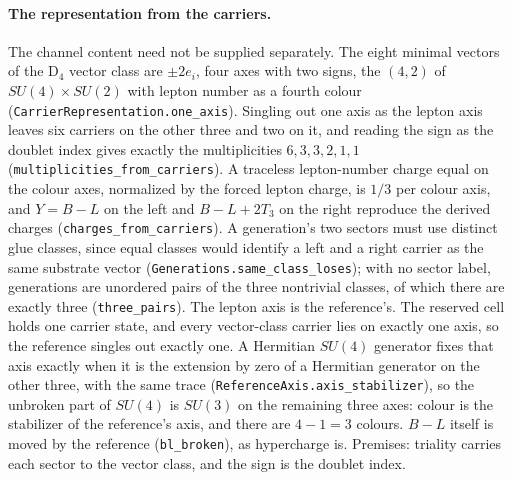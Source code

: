 \paragraph{The representation from the carriers.} The channel content need not be supplied separately. The eight minimal vectors of the D$_4$ vector class are $\pm2e_i$, four axes with two signs, the $(4,2)$ of $SU(4)\times SU(2)$ with lepton number as a fourth colour (\texttt{CarrierRepresentation.one\_axis}). Singling out one axis as the lepton axis leaves six carriers on the other three and two on it, and reading the sign as the doublet index gives exactly the multiplicities $6,3,3,2,1,1$ (\texttt{multiplicities\_from\_carriers}). A traceless lepton-number charge equal on the colour axes, normalized by the forced lepton charge, is $1/3$ per colour axis, and $Y=B-L$ on the left and $B-L+2T_3$ on the right reproduce the derived charges (\texttt{charges\_from\_carriers}). A generation's two sectors must use distinct glue classes, since equal classes would identify a left and a right carrier as the same substrate vector (\texttt{Generations.same\_class\_loses}); with no sector label, generations are unordered pairs of the three nontrivial classes, of which there are exactly three (\texttt{three\_pairs}). The lepton axis is the reference's. The reserved cell holds one carrier state, and every vector-class carrier lies on exactly one axis, so the reference singles out exactly one. A Hermitian $SU(4)$ generator fixes that axis exactly when it is the extension by zero of a Hermitian generator on the other three, with the same trace (\texttt{ReferenceAxis.axis\_stabilizer}), so the unbroken part of $SU(4)$ is $SU(3)$ on the remaining three axes: colour is the stabilizer of the reference's axis, and there are $4-1=3$ colours. $B-L$ itself is moved by the reference (\texttt{bl\_broken}), as hypercharge is. Premises: triality carries each sector to the vector class, and the sign is the doublet index.
